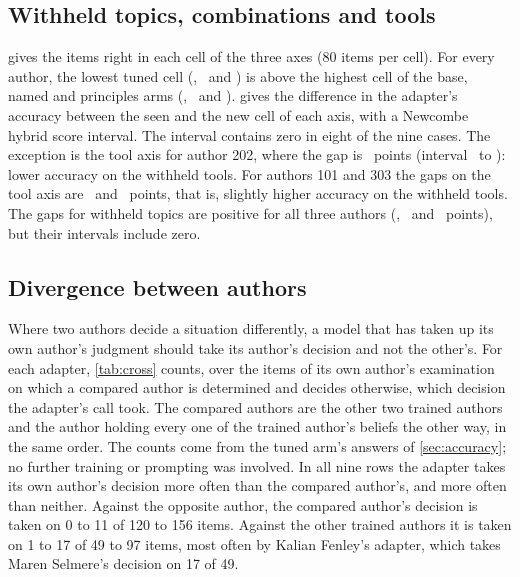 \subsection{Withheld topics, combinations and tools}\label{sec:cells}

 gives the items right in each cell of the three axes (80 items per cell). For
every author, the lowest tuned cell (\MinTunedCellA, \MinTunedCellB\ and \MinTunedCellC) is above the highest cell
of the base, named and principles arms (\MaxPromptedCellA, \MaxPromptedCellB\ and \MaxPromptedCellC).
 gives the difference in the adapter's accuracy between the seen and the new
cell of each axis, with a Newcombe hybrid score interval. The
interval contains zero in eight of the nine cases. The exception is the tool axis for author 202, where
the gap is \GapBTool\ points (interval \GapLoBTool\ to \GapHiBTool): lower accuracy on the withheld tools. For
authors 101 and 303 the gaps on the tool axis are \GapATool\ and \GapCTool\ points, that is, slightly higher accuracy on the withheld tools. The gaps for withheld topics
are positive for all three authors (\GapATopic, \GapBTopic\ and \GapCTopic\ points), but their intervals include zero.

\begin{table}[t]
\centering\footnotesize

\caption{Items right in each cell of the three axes (80 items per cell).}
\label{tab:cells}
\end{table}

\begin{table}[t]
\centering\small

\caption{Adapter accuracy on the seen cell minus the new cell, in points, with a 95\% Newcombe
interval, for each axis; positive means worse on the withheld cell.}
\label{tab:gaps}
\end{table}

\subsection{Divergence between authors}\label{sec:divergence}

Where two authors decide a situation differently, a model that has taken up its own author's
judgment should take its author's decision and not the other's. For each adapter,
\cref{tab:cross} counts, over the items of its own author's examination on which a compared
author is determined and decides otherwise, which decision the adapter's call took. The
compared authors are the other two trained authors and the author holding every one of the
trained author's beliefs the other way, in the same order. The counts come from the tuned
arm's answers of \cref{sec:accuracy}; no further training or prompting was involved. In all
nine rows the adapter takes its own author's decision more often than the compared author's,
and more often than neither. Against the opposite author, the compared author's decision is
taken on 0 to 11 of 120 to 156 items. Against the other trained authors it is taken on 1 to 17
of 49 to 97 items, most often by Kalian Fenley's adapter, which takes Maren Selmere's decision
on 17 of 49.

